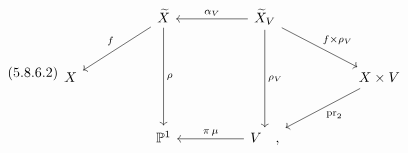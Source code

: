 \begin{equation}\tag{5.8.6.2}
\begin{tikzcd}[column sep=huge, row sep=large]
 {} & \widetilde{X} \arrow[dl, "f"'] \arrow[dd, "\rho"] & \widetilde{X}_V \arrow[l, "\alpha_V"'] \arrow[dd, "\rho_V"] \arrow[dr, "f\times\rho_V"] & {} \\
X & {} & {} & X\times V \arrow[dl, "\mathrm{pr}_2"] \\
 {} & \mathbb{P}^1 & V \arrow[l, "{\pi\,\mu}"'] \quad , &
{} \end{tikzcd}
\end{equation}



